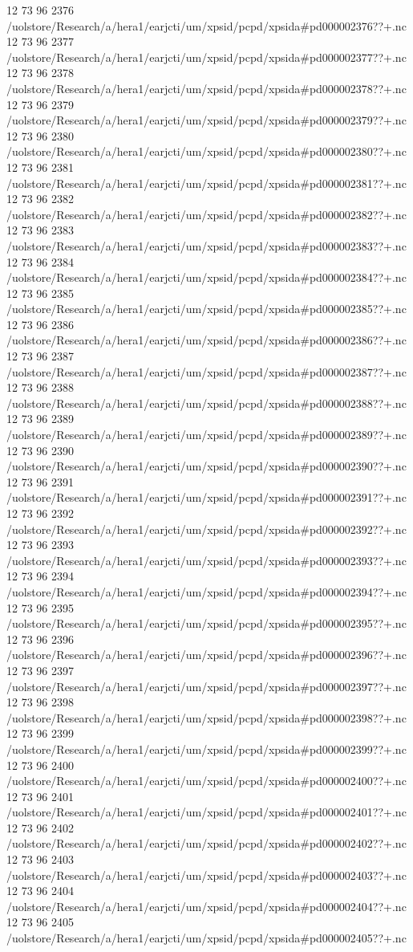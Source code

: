 12 73 96
2376
/uolstore/Research/a/hera1/earjcti/um/xpsid/pcpd/xpsida#pd000002376??+.nc
12 73 96
2377
/uolstore/Research/a/hera1/earjcti/um/xpsid/pcpd/xpsida#pd000002377??+.nc
12 73 96
2378
/uolstore/Research/a/hera1/earjcti/um/xpsid/pcpd/xpsida#pd000002378??+.nc
12 73 96
2379
/uolstore/Research/a/hera1/earjcti/um/xpsid/pcpd/xpsida#pd000002379??+.nc
12 73 96
2380
/uolstore/Research/a/hera1/earjcti/um/xpsid/pcpd/xpsida#pd000002380??+.nc
12 73 96
2381
/uolstore/Research/a/hera1/earjcti/um/xpsid/pcpd/xpsida#pd000002381??+.nc
12 73 96
2382
/uolstore/Research/a/hera1/earjcti/um/xpsid/pcpd/xpsida#pd000002382??+.nc
12 73 96
2383
/uolstore/Research/a/hera1/earjcti/um/xpsid/pcpd/xpsida#pd000002383??+.nc
12 73 96
2384
/uolstore/Research/a/hera1/earjcti/um/xpsid/pcpd/xpsida#pd000002384??+.nc
12 73 96
2385
/uolstore/Research/a/hera1/earjcti/um/xpsid/pcpd/xpsida#pd000002385??+.nc
12 73 96
2386
/uolstore/Research/a/hera1/earjcti/um/xpsid/pcpd/xpsida#pd000002386??+.nc
12 73 96
2387
/uolstore/Research/a/hera1/earjcti/um/xpsid/pcpd/xpsida#pd000002387??+.nc
12 73 96
2388
/uolstore/Research/a/hera1/earjcti/um/xpsid/pcpd/xpsida#pd000002388??+.nc
12 73 96
2389
/uolstore/Research/a/hera1/earjcti/um/xpsid/pcpd/xpsida#pd000002389??+.nc
12 73 96
2390
/uolstore/Research/a/hera1/earjcti/um/xpsid/pcpd/xpsida#pd000002390??+.nc
12 73 96
2391
/uolstore/Research/a/hera1/earjcti/um/xpsid/pcpd/xpsida#pd000002391??+.nc
12 73 96
2392
/uolstore/Research/a/hera1/earjcti/um/xpsid/pcpd/xpsida#pd000002392??+.nc
12 73 96
2393
/uolstore/Research/a/hera1/earjcti/um/xpsid/pcpd/xpsida#pd000002393??+.nc
12 73 96
2394
/uolstore/Research/a/hera1/earjcti/um/xpsid/pcpd/xpsida#pd000002394??+.nc
12 73 96
2395
/uolstore/Research/a/hera1/earjcti/um/xpsid/pcpd/xpsida#pd000002395??+.nc
12 73 96
2396
/uolstore/Research/a/hera1/earjcti/um/xpsid/pcpd/xpsida#pd000002396??+.nc
12 73 96
2397
/uolstore/Research/a/hera1/earjcti/um/xpsid/pcpd/xpsida#pd000002397??+.nc
12 73 96
2398
/uolstore/Research/a/hera1/earjcti/um/xpsid/pcpd/xpsida#pd000002398??+.nc
12 73 96
2399
/uolstore/Research/a/hera1/earjcti/um/xpsid/pcpd/xpsida#pd000002399??+.nc
12 73 96
2400
/uolstore/Research/a/hera1/earjcti/um/xpsid/pcpd/xpsida#pd000002400??+.nc
12 73 96
2401
/uolstore/Research/a/hera1/earjcti/um/xpsid/pcpd/xpsida#pd000002401??+.nc
12 73 96
2402
/uolstore/Research/a/hera1/earjcti/um/xpsid/pcpd/xpsida#pd000002402??+.nc
12 73 96
2403
/uolstore/Research/a/hera1/earjcti/um/xpsid/pcpd/xpsida#pd000002403??+.nc
12 73 96
2404
/uolstore/Research/a/hera1/earjcti/um/xpsid/pcpd/xpsida#pd000002404??+.nc
12 73 96
2405
/uolstore/Research/a/hera1/earjcti/um/xpsid/pcpd/xpsida#pd000002405??+.nc
